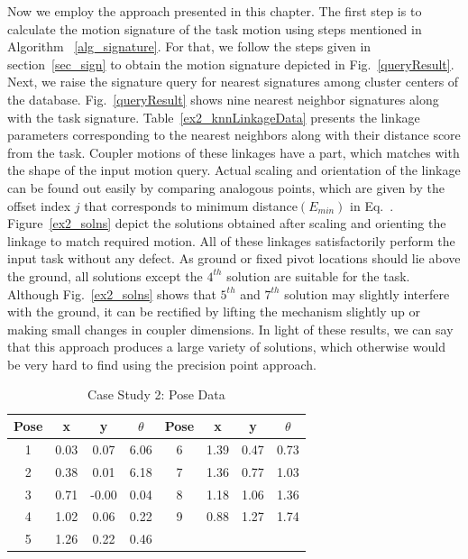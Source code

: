 Now we employ the approach presented in this chapter.
The first step is to calculate the motion signature of the task motion using steps mentioned in Algorithm ~\ref{alg_signature}.
For that, we follow the steps given in section~\ref{sec_sign} to obtain the motion signature depicted in Fig.~\ref{queryResult}.
Next, we raise the signature query for nearest signatures among cluster centers of the database.
Fig.~\ref{queryResult} shows nine nearest neighbor signatures along with the task signature.
Table~\ref{ex2_knnLinkageData} presents the linkage parameters corresponding to the nearest neighbors along with their distance score from the task.
Coupler motions of these linkages have a part, which matches with the shape of the input motion query.
Actual scaling and orientation of the linkage can be found out easily by comparing analogous points, which are given by the offset index $j$ that corresponds to minimum distance$(E_{min})$ in Eq.~.
Figure~\ref{ex2_solns} depict the solutions obtained after scaling and orienting the linkage to match required motion.
All of these linkages satisfactorily perform the input task without any defect.
As ground or fixed pivot locations should lie above the ground, all solutions except the $4^{th}$ solution are suitable for the task.
Although Fig.~\ref{ex2_solns} shows that $5^{th}$ and $7^{th}$ solution may slightly interfere with the ground, it can be rectified by lifting the mechanism slightly up or making small changes in coupler dimensions.
In light of these results, we can say that this approach produces a large variety of solutions, which otherwise would be very hard to find using the precision point approach.


\begin{table}
\caption{Case Study 2: Pose Data}
\centering
\label{poseData}
\begin{tabular}{cccccccc}
\hline
Pose & x & y & $\theta$ & Pose & x & y & $\theta$ \\
\hline
1 & 0.03 & 0.07 & 6.06 & 6 & 1.39 & 0.47 & 0.73 \\
2 & 0.38 & 0.01 & 6.18 & 7 & 1.36 & 0.77 & 1.03 \\
3 & 0.71 &-0.00 & 0.04 & 8 & 1.18 & 1.06 & 1.36 \\
4 & 1.02 & 0.06 & 0.22 & 9 & 0.88 & 1.27 & 1.74 \\
5 & 1.26 & 0.22 & 0.46 & \\
\end{tabular}
\end{table}


